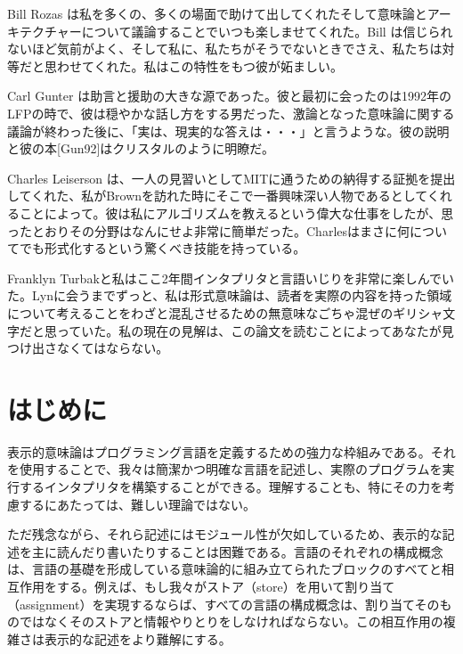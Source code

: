\documentclass[11pt, oneside]{jsbook}   	%
\begin{document}
Bill Rozas は私を多くの、多くの場面で助けて出してくれたそして意味論とアーキテクチャーについて議論することでいつも楽しませてくれた。Bill は信じられないほど気前がよく、そして私に、私たちがそうでないときでさえ、私たちは対等だと思わせてくれた。私はこの特性をもつ彼が妬ましい。

Carl Gunter は助言と援助の大きな源であった。彼と最初に会ったのは1992年のLFPの時で、彼は穏やかな話し方をする男だった、激論となった意味論に関する議論が終わった後に、「実は、現実的な答えは・・・」と言うような。彼の説明と彼の本[Gun92]はクリスタルのように明瞭だ。

Charles Leiserson は、一人の見習いとしてMITに通うための納得する証拠を提出してくれた、私がBrownを訪れた時にそこで一番興味深い人物であるとしてくれることによって。彼は私にアルゴリズムを教えるという偉大な仕事をしたが、思ったとおりその分野はなんにせよ非常に簡単だった。Charlesはまさに何についてでも形式化するという驚くべき技能を持っている。

Franklyn Turbakと私はここ2年間インタプリタと言語いじりを非常に楽しんでいた。Lynに会うまでずっと、私は形式意味論は、読者を実際の内容を持った領域について考えることをわざと混乱させるための無意味なごちゃ混ぜのギリシャ文字だと思っていた。私の現在の見解は、この論文を読むことによってあなたが見つけ出さなくてはならない。
\newpage


\chapter{はじめに}
表示的意味論はプログラミング言語を定義するための強力な枠組みである。それを使用することで、我々は簡潔かつ明確な言語を記述し、実際のプログラムを実行するインタプリタを構築することができる。理解することも、特にその力を考慮するにあたっては、難しい理論ではない。

ただ残念ながら、それら記述にはモジュール性が欠如しているため、表示的な記述を主に読んだり書いたりすることは困難である。言語のそれぞれの構成概念は、言語の基礎を形成している意味論的に組み立てられたブロックのすべてと相互作用をする。例えば、もし我々がストア（store）を用いて割り当て（assignment）を実現するならば、すべての言語の構成概念は、割り当てそのものではなくそのストアと情報やりとりをしなければならない。この相互作用の複雑さは表示的な記述をより難解にする。
\end{document}
